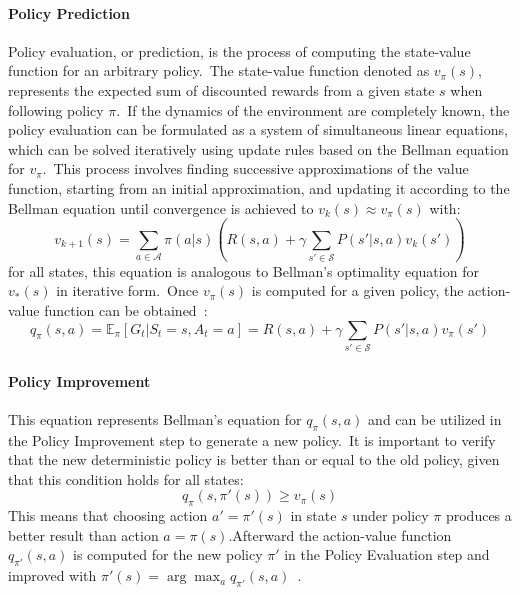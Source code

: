\documentclass[../xlapes02]{subfiles}
\begin{document}
    \paragraph{Policy Prediction}\label{par:policy-prediction}
    Policy evaluation, or prediction, is the process of computing the state-value function for an arbitrary policy.\ The state-value function denoted as $v_\pi(s)$, represents the expected sum of discounted rewards from a given state $s$ when following policy $\pi$.\ If the dynamics of the environment are completely known, the policy evaluation can be formulated as a system of simultaneous linear equations, which can be solved iteratively using update rules based on the Bellman equation for $v_\pi$.\ This process involves finding successive approximations of the value function, starting from an initial approximation, and updating it according to the Bellman equation until convergence is achieved to $v_k(s) \approx v_{\pi}(s)$ with:
    \begin{equation}
        \label{eq:bellman-expectation-equation}
        v_{k+1}(s)=\sum_{a\in\mathcal{A}}\pi(a|s)\left(R(s,a)+\gamma\sum_{s'\in\mathcal{S}}P(s'|s,a)v_k(s')\right)
    \end{equation}
    for all states, this equation is analogous to Bellman's optimality equation for $v_*(s)$ in iterative form.\ Once $v_\pi(s)$ is computed for a given policy, the action-value function can be obtained~\cite{sutton2018reinforcement, FITMT25127}:
    \begin{equation}
        \label{eq:action-value-function}
        q_{\pi}(s,a)=\mathbb{E}_{\pi}[G_t|S_t=s,A_t=a]=R(s,a)+\gamma\sum_{s'\in\mathcal{S}}P(s'|s,a)v_{\pi}(s')
    \end{equation}

    \paragraph{Policy Improvement}\label{par:policy-improvement}
    This equation represents Bellman's equation for $q_\pi(s,a)$ and can be utilized in the Policy Improvement step to generate a new policy.\ It is important to verify that the new deterministic policy is better than or equal to the old policy, given that this condition holds for all states:
    \begin{equation}
        \label{eq:policy-improvement}
        q_{\pi}(s,\pi'(s))\geq v_{\pi}(s)
    \end{equation}
    This means that choosing action $a' = \pi'(s)$ in state $s$ under policy $\pi$ produces a better result than action $a = \pi(s)$.Afterward the action-value function $q_{\pi'}(s, a)$ is computed for the new policy $\pi'$ in the Policy Evaluation step and improved with $\pi'(s) = \arg\max_a q_{\pi'}(s, a)$~\cite{sutton2018reinforcement, FITMT25127}.
\end{document}
